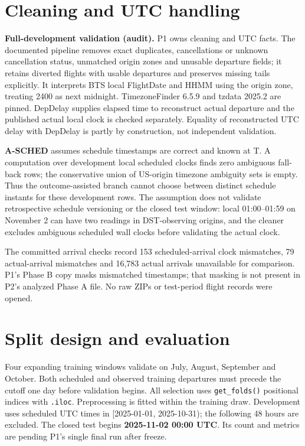 \documentclass{article}
\begin{document}
\section{Cleaning and UTC handling}
\textbf{Full-development validation (audit).}
P1 owns cleaning and UTC facts. The documented pipeline removes exact duplicates, cancellations or unknown cancellation status, unmatched origin zones and unusable departure fields; it retains diverted flights with usable departures and preserves missing tails explicitly. It interprets BTS local FlightDate and HHMM using the origin zone, treating 2400 as next midnight. TimezoneFinder 6.5.9 and tzdata 2025.2 are pinned. DepDelay supplies elapsed time to reconstruct actual departure and the published actual local clock is checked separately. Equality of reconstructed UTC delay with DepDelay is partly by construction, not independent validation.

\textbf{A-SCHED} assumes schedule timestamps are correct and known at T. A computation over development local scheduled clocks finds zero ambiguous fall-back rows; the conservative union of US-origin timezone ambiguity sets is empty. Thus the outcome-assisted branch cannot choose between distinct schedule instants for these development rows. The assumption does not validate retrospective schedule versioning or the closed test window: local 01:00--01:59 on November 2 can have two readings in DST-observing origins, and the cleaner excludes ambiguous scheduled wall clocks before validating the actual clock.

The committed arrival checks record 153 scheduled-arrival clock mismatches, 79 actual-arrival mismatches and 16,783 actual arrivals unavailable for comparison. P1's Phase B copy masks mismatched timestamps; that masking is not present in P2's analyzed Phase A file. No raw ZIPs or test-period flight records were opened.
\section{Split design and evaluation}
Four expanding training windows validate on July, August, September and October. Both scheduled and observed training departures must precede the cutoff one day before validation begins. All selection uses \texttt{get\_folds()} positional indices with \texttt{.iloc}. Preprocessing is fitted within the training draw. Development uses scheduled UTC times in [2025-01-01, 2025-10-31); the following 48 hours are excluded. The closed test begins \textbf{2025-11-02 00:00 UTC}. Its count and metrics are pending P1's single final run after freeze.
\end{document}
